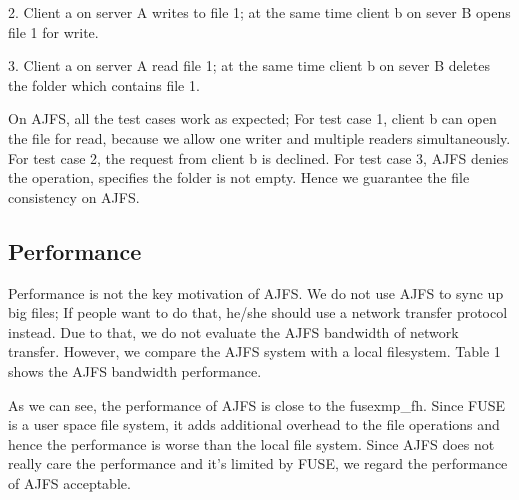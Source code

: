 2. Client a on server A writes to file 1; at the same time client b on sever B opens file 1 for write.

3. Client a on server A read file 1; at the same time client b on sever B deletes the folder which contains file 1.

On AJFS, all the test cases work as expected; For test case 1, client b can open the file for read, because we allow one writer and multiple readers simultaneously. For test case 2, the request from client b is declined. For test case 3, AJFS denies the operation, specifies the folder is not empty. Hence we guarantee the file consistency on AJFS.

\subsection{Performance}

Performance is not the key motivation of AJFS. We do not use AJFS to sync up big files; If people want to do that, he/she should use a network transfer protocol instead. Due to that, we do not evaluate the AJFS bandwidth of network transfer.
However, we compare the AJFS system with a local filesystem. Table 1 shows the AJFS bandwidth performance. 

As we can see, the performance of AJFS is close to the fusexmp_fh. Since FUSE is a user space file system, it adds additional overhead to the file operations and hence the performance is worse than the local file system. Since AJFS does not really care the performance and it's limited by FUSE, we regard the performance of AJFS acceptable. 
